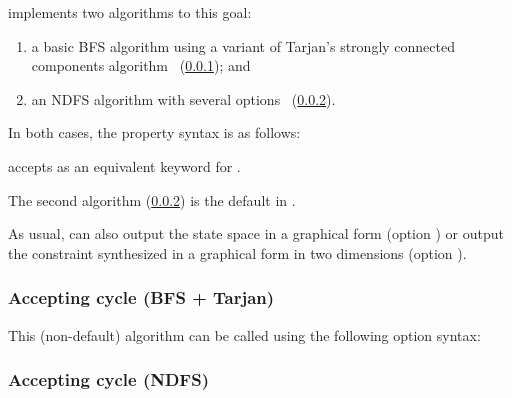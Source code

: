 \imitator{} implements two algorithms to this goal:
\begin{enumerate}
	\item a basic BFS algorithm using a variant of Tarjan's strongly connected components algorithm~\cite{AAPP21} (\cref{sss:accepting-loop-BFS}); and
	\item an NDFS algorithm with several options~\cite{NPP18,AAPP21} (\cref{sss:accepting-loop-NDFS}).
\end{enumerate}

In both cases, the property syntax is as follows:


\begin{syntaxalias}
	\imitator{} accepts  as an equivalent keyword for .
\end{syntaxalias}



The second algorithm (\cref{sss:accepting-loop-NDFS}) is the default in \imitator{}.


As usual, \imitator{} can also
output the state space in a graphical form (option )
or
output the constraint synthesized in a graphical form in two dimensions (option ).


\subsubsection{Accepting cycle (BFS + Tarjan)}\label{sss:accepting-loop-BFS}

This (non-default) algorithm can be called using the following option syntax:



\subsubsection{Accepting cycle (NDFS)}\label{sss:accepting-loop-NDFS}

